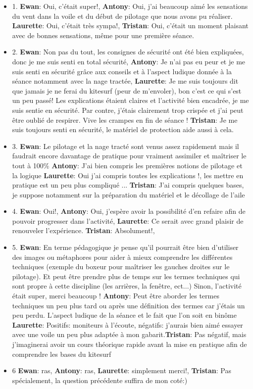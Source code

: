 \documentclass[11pt,a4paper]{report}
\begin{document}
\begin{itemize}
\item 1. \textbf{Ewan}: Oui, c'était super!, \textbf{Antony}: Oui, j'ai
beaucoup aimé les sensations du vent  dans la voile et du début de
pilotage que nous avons  pu réaliser.                                      
\textbf{Laurette}: Oui, c'était très sympa!, \textbf{Tristan}: Oui,
c'était un moment plaisant avec de bonnes sensations, m\^eme pour
une première séance.
\item 2. \textbf{Ewan}: Non pas du tout, les consignes de sécurité
ont été bien expliquées, donc je me suis senti en total sécurité,
\textbf{Antony}: Je n'ai pas eu peur et je me suis senti en
sécurité gr\^ace aux conseils et à l'aspect ludique donnée à la séance 
notamment avec la nage tractée, \textbf{Laurette}: Je me suis
toujours dit que jamais je ne ferai du kitesurf (peur de m'envoler),
bon c'est ce qui s'est un peu passé! Les explications étaient 
claires et l'activité bien encadrée, je me suis sentie en sécurité.
Par contre, j'étais clairement trop crispée et j'ai peut \^etre
oublié de respirer. Vive les crampes en fin de séance ! 
\textbf{Tristan}: Je me suis toujours senti en sécurité, le matériel
de protection aide aussi à cela.
\item 3. \textbf{Ewan}: Le pilotage et la nage tracté sont venus
assez rapidement mais il faudrait encore davantage de pratique
pour vraiment assimiler et maîtriser le tout à 100\%
\textbf{Antony}: J'ai bien compris les premières notions de
pilotage et la logique \textbf{Laurette}: Oui j'ai compris
toutes les explications !, les mettre en pratique est un
peu plus compliqué ...
\textbf{Tristan}: J'ai compris quelques bases, je suppose
notamment sur la préparation du matériel et le décollage de l'aile
\item 4. \textbf{Ewan}: Oui!, \textbf{Antony}: Oui, j'espère
avoir la possibilité d'en refaire afin de pouvoir progresser
dans l'activité, \textbf{Laurette}: Ce serait avec grand plaisir
de renouveler l'expérience.
\textbf{Tristan}: Absolument!, 
\item 5. \textbf{Ewan}: En terme pédagogique je pense qu'il
pourrait \^etre bien d'utiliser des images ou métaphores pour
aider à mieux comprendre les différentes techniques (exemple
du boxeur pour maîtriser les gauches droites sur le  pilotage).
Et peut \^etre prendre plus de temps sur les termes techniques
qui sont propre à cette discipline (les arrières, la fen\^etre, ect...) 
Sinon, l'activité était super, merci beaucoup !
\textbf{Antony}: Peut \^etre aborder les termes techniques un 
peu plus tard ou après une définition des termes car j'étais un
peu perdu. L'aspect ludique de la séance et le fait que l'on
soit en bin\^ome \textbf{Laurette}: Positifs: moniteurs à
l'écoute, négatifs: j'aurais bien aimé essayer avec une
voile un peu plus adaptée à mon gabarit.\textbf{Tristan}: 
Pas négatif, mais j'imaginerai avoir un cours théorique rapide avant
la mise en pratique afin de comprendre les bases du kitesurf
\item 6 \textbf{Ewan}: ras, \textbf{Antony}: ras, 
\textbf{Laurette}: simplement merci!, \textbf{Tristan}: 
Pas spécialement, la question précédente suffira de mon coté:)
\end{itemize}
\end{document}
